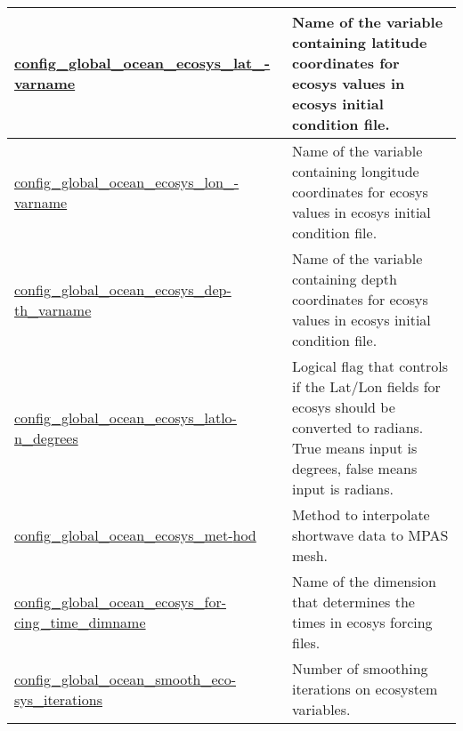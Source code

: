 {\begin{center}
\begin{longtable}{| p{2.0in} || p{4.0in} |}
    \hline
    \hyperref[subsec:nm_sec_config_global_ocean_ecosys_lat_varname]{config\_global\_ocean\_ecosys\_lat\_-}\hyperref[subsec:nm_sec_config_global_ocean_ecosys_lat_varname]{varname}& Name of the variable containing latitude coordinates for ecosys values in ecosys initial condition file. \\
    \hline
    \hyperref[subsec:nm_sec_config_global_ocean_ecosys_lon_varname]{config\_global\_ocean\_ecosys\_lon\_-}\hyperref[subsec:nm_sec_config_global_ocean_ecosys_lon_varname]{varname}& Name of the variable containing longitude coordinates for ecosys values in ecosys initial condition file. \\
    \hline
    \hyperref[subsec:nm_sec_config_global_ocean_ecosys_depth_varname]{config\_global\_ocean\_ecosys\_dep-}\hyperref[subsec:nm_sec_config_global_ocean_ecosys_depth_varname]{th\_varname}& Name of the variable containing depth coordinates for ecosys values in ecosys initial condition file. \\
    \hline
    \hyperref[subsec:nm_sec_config_global_ocean_ecosys_latlon_degrees]{config\_global\_ocean\_ecosys\_latlo-}\hyperref[subsec:nm_sec_config_global_ocean_ecosys_latlon_degrees]{n\_degrees}& Logical flag that controls if the Lat/Lon fields for ecosys should be converted to radians. True means input is degrees, false means input is radians. \\
    \hline
    \hyperref[subsec:nm_sec_config_global_ocean_ecosys_method]{config\_global\_ocean\_ecosys\_met-}\hyperref[subsec:nm_sec_config_global_ocean_ecosys_method]{hod}& Method to interpolate shortwave data to MPAS mesh. \\
    \hline
    \hyperref[subsec:nm_sec_config_global_ocean_ecosys_forcing_time_dimname]{config\_global\_ocean\_ecosys\_for-}\hyperref[subsec:nm_sec_config_global_ocean_ecosys_forcing_time_dimname]{cing\_time\_dimname}& Name of the dimension that determines the times in ecosys forcing files. \\
    \hline
    \hyperref[subsec:nm_sec_config_global_ocean_smooth_ecosys_iterations]{config\_global\_ocean\_smooth\_eco-}\hyperref[subsec:nm_sec_config_global_ocean_smooth_ecosys_iterations]{sys\_iterations}& Number of smoothing iterations on ecosystem variables. \\
    \hline
\end{longtable}
\end{center}
}

